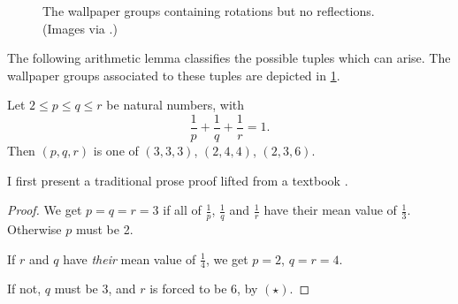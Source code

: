 \documentclass[runningheads]{llncs}
\begin{document}
\begin{figure}[!htb]
  \centering
  \hfill
  \hfill
  \caption{The wallpaper groups containing
  rotations but no reflections. (Images via \cite{Eck}.)}
  \label{fig:wallpaper}
\end{figure} 

The following arithmetic lemma
classifies the possible tuples which can arise.
The wallpaper groups associated to these tuples are depicted in \cref{fig:wallpaper}.

\begin{lemma}
  Let $2\le p \le q \le r$ be natural numbers, with
  \begin{equation}
    \frac{1}{p}+\frac{1}{q}+\frac{1}{r}=1. \tag{$\star$}
  \end{equation}
  Then $(p, q, r)$ is one of $(3,3,3)$, $(2,4,4)$, $(2,3,6)$.
\end{lemma}


I first present a traditional prose proof
lifted from a textbook \cite{CBG08}.
\begin{proof}
  We get $p=q=r=3$ if all of $\frac{1}{p}$, $\frac{1}{q}$ and $\frac{1}{r}$ have their mean value
  of $\frac{1}{3}$.  Otherwise $p$ must be 2.

  If $r$ and $q$ have \emph{their} mean value of $\frac{1}{4}$, we get $p=2$, $q=r=4$.

  If not, $q$ must be 3, and $r$ is forced to be 6, by $(\star)$.
\end{proof}
\end{document}
